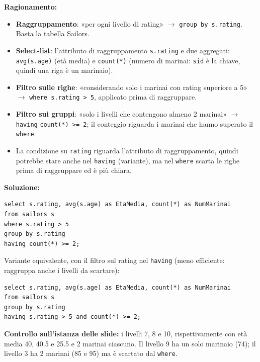 \documentclass[12pt, a4paper]{article}
\begin{document}
\textbf{Ragionamento:}
\begin{itemize}
\item \textbf{Raggruppamento}: «per ogni livello di rating» $\to$ \texttt{group by s.rating}. Basta la tabella Sailors.
\item \textbf{Select-list}: l'attributo di raggruppamento \texttt{s.rating} e due aggregati: \texttt{avg(s.age)} (età media) e \texttt{count(*)} (numero di marinai: \texttt{sid} è la chiave, quindi una riga è un marinaio).
\item \textbf{Filtro sulle righe}: «considerando solo i marinai con rating superiore a 5» $\to$ \mbox{\texttt{where s.rating > 5}}, applicato prima di raggruppare.
\item \textbf{Filtro sui gruppi}: «solo i livelli che contengono almeno 2 marinai» $\to$ \texttt{having} \mbox{\texttt{count(*) >= 2}}; il conteggio riguarda i marinai che hanno superato il \texttt{where}.
\item La condizione su \texttt{rating} riguarda l'attributo di raggruppamento, quindi potrebbe stare anche nel \texttt{having} (variante), ma nel \texttt{where} scarta le righe prima di raggruppare ed è più chiara.
\end{itemize}

\textbf{Soluzione:}
\begin{verbatim}
select s.rating, avg(s.age) as EtaMedia, count(*) as NumMarinai
from sailors s
where s.rating > 5
group by s.rating
having count(*) >= 2;
\end{verbatim}
Variante equivalente, con il filtro sul rating nel \texttt{having} (meno efficiente: raggruppa anche i livelli da scartare):
\begin{verbatim}
select s.rating, avg(s.age) as EtaMedia, count(*) as NumMarinai
from sailors s
group by s.rating
having s.rating > 5 and count(*) >= 2;
\end{verbatim}
\textbf{Controllo sull'istanza delle slide:} i livelli 7, 8 e 10, rispettivamente con età media 40, 40.5 e 25.5 e 2 marinai ciascuno. Il livello 9 ha un solo marinaio (74); il livello 3 ha 2 marinai (85 e 95) ma è scartato dal \texttt{where}.
\end{document}
